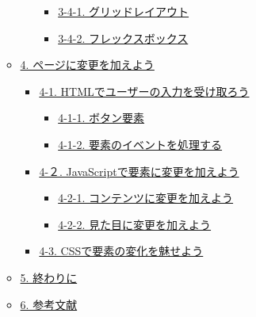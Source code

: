 \begin{itemize}
\begin{itemize}
\begin{itemize}
      \begin{itemize}
      \tightlist
      \item
        \hyperref[3-4-1-ux30b0ux30eaux30c3ux30c9ux30ecux30a4ux30a2ux30a6ux30c8]{3-4-1.
        グリッドレイアウト}
      \item
        \hyperref[3-4-2-ux30d5ux30ecux30c3ux30afux30b9ux30dcux30c3ux30afux30b9]{3-4-2.
        フレックスボックス}
      \end{itemize}
    \end{itemize}
  \item
    \hyperref[4-ux30daux30fcux30b8ux306bux5909ux66f4ux3092ux52a0ux3048ux3088ux3046]{4.
    ページに変更を加えよう}

    \begin{itemize}
    \tightlist
    \item
      \hyperref[4-1-htmlux3067ux30e6ux30fcux30b6ux30fcux306eux5165ux529bux3092ux53d7ux3051ux53d6ux308dux3046]{4-1.
      HTMLでユーザーの入力を受け取ろう}

      \begin{itemize}
      \tightlist
      \item
        \hyperref[4-1-1-ux30dcux30bfux30f3ux8981ux7d20]{4-1-1.
        ボタン要素}
      \item
        \hyperref[4-1-2-ux8981ux7d20ux306eux30a4ux30d9ux30f3ux30c8ux3092ux51e6ux7406ux3059ux308b]{4-1-2.
        要素のイベントを処理する}
      \end{itemize}
    \item
      \hyperref[4-uxff12-javascriptux3067ux8981ux7d20ux306bux5909ux66f4ux3092ux52a0ux3048ux3088ux3046]{4-２.
      JavaScriptで要素に変更を加えよう}

      \begin{itemize}
      \tightlist
      \item
        \hyperref[4-2-1-ux30b3ux30f3ux30c6ux30f3ux30c4ux306bux5909ux66f4ux3092ux52a0ux3048ux3088ux3046]{4-2-1.
        コンテンツに変更を加えよう}
      \item
        \hyperref[4-2-2-ux898bux305fux76eeux306bux5909ux66f4ux3092ux52a0ux3048ux3088ux3046]{4-2-2.
        見た目に変更を加えよう}
      \end{itemize}
    \item
      \hyperref[4-3-cssux3067ux8981ux7d20ux306eux5909ux5316ux3092ux9b45ux305bux3088ux3046]{4-3.
      CSSで要素の変化を魅せよう}
    \end{itemize}
  \item
    \hyperref[5-ux7d42ux308fux308aux306b]{5. 終わりに}
  \item
    \hyperref[6-ux53c2ux8003ux6587ux732e]{6. 参考文献}
  \end{itemize}
\end{itemize}


